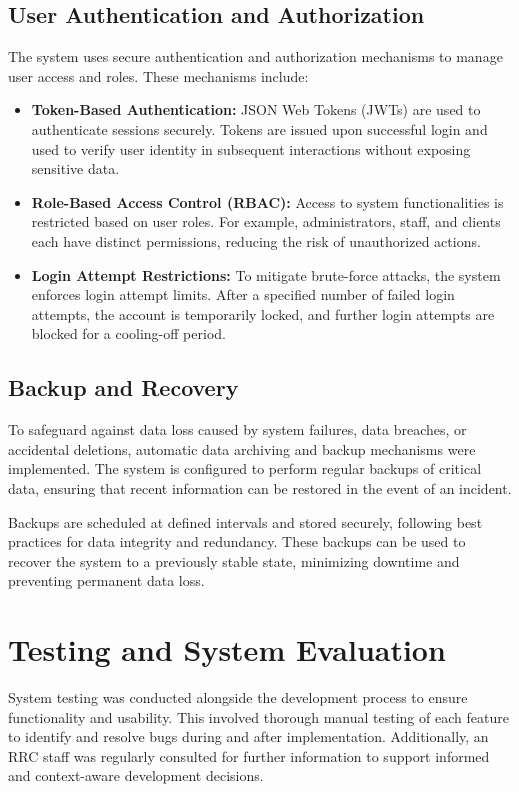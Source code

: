 \subsection{User Authentication and Authorization}

The system uses secure authentication and authorization mechanisms to manage user access and roles. These mechanisms include:

\begin{itemize}
	\item \textbf{Token-Based Authentication:} JSON Web Tokens (JWTs) are used to authenticate sessions securely. Tokens are issued upon successful login and used to verify user identity in subsequent interactions without exposing sensitive data.
	\item \textbf{Role-Based Access Control (RBAC):} Access to system functionalities is restricted based on user roles. For example, administrators, staff, and clients each have distinct permissions, reducing the risk of unauthorized actions.
	\item \textbf{Login Attempt Restrictions:} To mitigate brute-force attacks, the system enforces login attempt limits. After a specified number of failed login attempts, the account is temporarily locked, and further login attempts are blocked for a cooling-off period.
\end{itemize}

\subsection{Backup and Recovery}

To safeguard against data loss caused by system failures, data breaches, or accidental deletions, automatic data archiving and backup mechanisms were implemented. The system is configured to perform regular backups of critical data, ensuring that recent information can be restored in the event of an incident.

Backups are scheduled at defined intervals and stored securely, following best practices for data integrity and redundancy. These backups can be used to recover the system to a previously stable state, minimizing downtime and preventing permanent data loss. 

\section{Testing and System Evaluation}

System testing was conducted alongside the development process to ensure functionality and usability. This involved thorough manual testing of each feature to identify and resolve bugs during and after implementation. Additionally, an RRC staff was regularly consulted for further information to support informed and context-aware development decisions.

